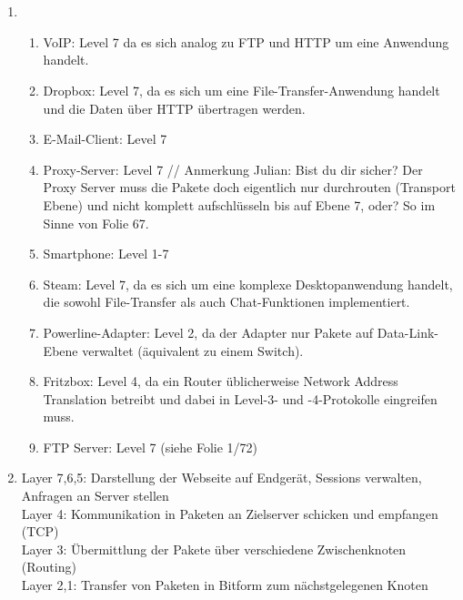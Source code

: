\documentclass[a4paper,
			llpt,
			solution,
			accentcolor=tud2d,
			colorbacktitle
			]
			{tudexercise}
\begin{document}
\section{}
\begin{enumerate}
\item
\begin{enumerate}

\item
VoIP:
Level 7 da es sich analog zu FTP und HTTP um eine Anwendung handelt.

\item
Dropbox:
Level 7, da es sich um eine File-Transfer-Anwendung handelt und die Daten über HTTP übertragen werden.

\item
E-Mail-Client:
Level 7

\item
Proxy-Server:
Level 7 // Anmerkung Julian: Bist du dir sicher? Der Proxy Server muss die Pakete doch eigentlich nur durchrouten (Transport Ebene) und nicht komplett aufschlüsseln bis auf Ebene 7, oder? So im Sinne von Folie 67.

\item
Smartphone:
Level 1-7

\item
Steam:
Level 7, da es sich um eine komplexe Desktopanwendung handelt, die sowohl File-Transfer als auch Chat-Funktionen implementiert.

\item
Powerline-Adapter:
Level 2, da der Adapter nur Pakete auf Data-Link-Ebene verwaltet (äquivalent zu einem Switch).

\item
Fritzbox:
Level 4, da ein Router üblicherweise Network Address Translation betreibt und dabei in Level-3- und -4-Protokolle eingreifen muss.

\item
FTP Server:
Level 7 (siehe Folie 1/72)
\end{enumerate}
\item

Layer 7,6,5: Darstellung der Webseite auf Endgerät, Sessions verwalten, Anfragen an Server stellen
\\
Layer 4: Kommunikation in Paketen an Zielserver schicken und empfangen (TCP)
\\
Layer 3: Übermittlung der Pakete über verschiedene Zwischenknoten (Routing)
\\
Layer 2,1: Transfer von Paketen in Bitform zum nächstgelegenen Knoten


\end{enumerate}
\end{document}
